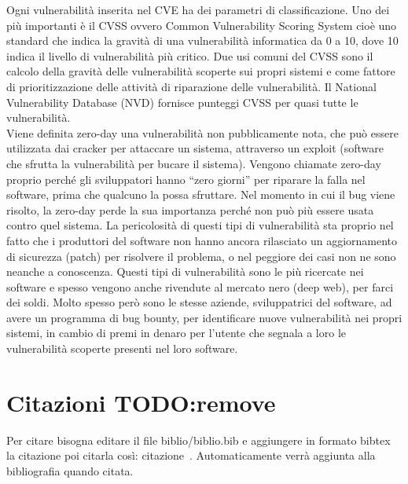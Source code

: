 Ogni vulnerabilità inserita nel CVE ha dei parametri di classificazione. 
Uno dei più importanti è il CVSS ovvero Common Vulnerability Scoring System 
cioè uno standard che indica la gravità di una vulnerabilità informatica 
da 0 a 10, dove 10 indica il livello di vulnerabilità più critico. 
Due usi comuni del CVSS sono il calcolo della gravità delle vulnerabilità 
scoperte sui propri sistemi e come fattore di prioritizzazione delle 
attività di riparazione delle vulnerabilità. Il National Vulnerability 
Database (NVD) fornisce punteggi CVSS per quasi tutte le vulnerabilità.\\

Viene definita zero-day una vulnerabilità non pubblicamente nota, che può 
essere utilizzata dai cracker per attaccare un sistema, attraverso un 
exploit (software che sfrutta la vulnerabilità per bucare il sistema). 
Vengono chiamate zero-day proprio perché gli sviluppatori hanno “zero giorni” 
per riparare la falla nel software, prima che qualcuno la possa sfruttare.
Nel momento in cui il bug viene risolto, la zero-day perde la sua importanza
perché non può più essere usata contro quel sistema.
La pericolosità di questi tipi di vulnerabilità sta proprio nel fatto che i 
produttori del software non hanno ancora rilasciato un aggiornamento di sicurezza 
(patch) per risolvere il problema, o nel peggiore dei casi non ne sono 
neanche a conoscenza. 
Questi tipi di vulnerabilità sono le più ricercate nei software e spesso 
vengono anche rivendute al mercato nero (deep web), per farci dei soldi.
Molto spesso però sono le stesse aziende, sviluppatrici del software, ad avere 
un programma di bug bounty, per identificare nuove vulnerabilità nei propri
sistemi, in cambio di premi in denaro per l’utente che segnala a loro
le vulnerabilità scoperte presenti nel loro software.


\section{Citazioni TODO:remove}
Per citare bisogna editare il file biblio/biblio.bib e aggiungere in formato bibtex la citazione poi citarla così: citazione~\cite{STORY}. 
Automaticamente verrà aggiunta alla bibliografia quando citata.
